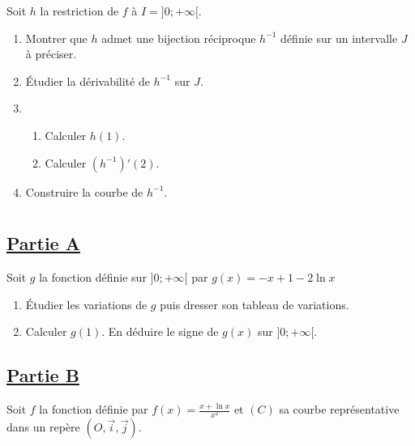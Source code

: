 \documentclass[12pt,a4paper]{article}
\begin{document}
Soit \( h \) la restriction de \( f \) à \( I =]0; +\infty[ \).

    \begin{enumerate}
        \item Montrer que \( h \) admet une bijection réciproque \( h^{-1} \) définie sur un intervalle \( J \) à préciser.
        \item Étudier la dérivabilité de \( h^{-1} \) sur \( J \).
        \item
              \begin{enumerate}
                  \item Calculer \( h(1) \).
                  \item Calculer \( (h^{-1})'(2) \).
              \end{enumerate}
        \item Construire la courbe de \( h^{-1} \).
    \end{enumerate}

    \section*{}

    \subsection*{\underline{\textbf{Partie A}}}

    Soit \( g \) la fonction définie sur \( ]0; +\infty[ \) par
    \( g(x) = -x + 1 - 2 \ln x \)

    \begin{enumerate}
        \item Étudier les variations de \( g \) puis dresser son tableau de variations.
        \item Calculer \( g(1) \). En déduire le signe de \( g(x) \) sur \( ]0; +\infty[ \).
    \end{enumerate}

    \subsection*{\underline{\textbf{Partie B}}}

    Soit \( f \) la fonction définie par \( f(x) = \frac{x + \ln x}{x^2} \)
    et \( (C) \) sa courbe représentative dans un repère \( (O, \vec{i}, \vec{j}) \).
\end{document}
